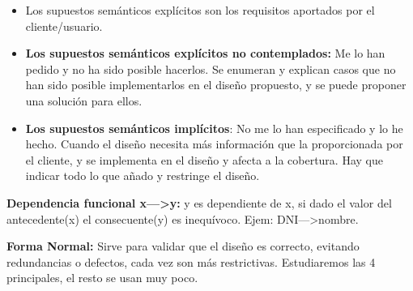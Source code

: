 \documentclass[12pt, twoside, openright]{report} %
\begin{document}
  \begin{itemize}
  \item Los supuestos semánticos explícitos son los requisitos aportados
    por el cliente/usuario.
    
  \item \textbf{Los supuestos semánticos explícitos no contemplados:} Me lo
    han pedido y no ha sido posible hacerlos. Se enumeran y explican
    casos que no han sido posible implementarlos en el diseño propuesto,
    y se puede proponer una solución para ellos.
    
  \item \textbf{Los supuestos semánticos implícitos}: No me lo han
    especificado y lo he hecho. Cuando el diseño necesita más
    información que la proporcionada por el cliente, y se implementa en
    el diseño y afecta a la cobertura. Hay que indicar todo lo que añado
    y restringe el diseño.
    
  \end{itemize}

  
  \textbf{Dependencia funcional x---\textgreater y:} y es dependiente de
  x, si dado el valor del antecedente(x) el consecuente(y) es
  inequívoco. Ejem: DNI---\textgreater nombre.
  

  
  \textbf{Forma Normal:} Sirve para validar que el diseño es correcto,
  evitando redundancias o defectos, cada vez son más restrictivas.
  Estudiaremos las 4 principales, el resto se usan muy poco.
  
\end{document}
